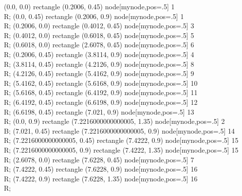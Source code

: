  (0.0, 0.0) rectangle (0.2006, 0.45) node[mynode,pos=.5] {1 \\ R};
 (0.0, 0.45) rectangle (0.2006, 0.9) node[mynode,pos=.5] {1 \\ R};
 (0.2006, 0.0) rectangle (0.4012, 0.45) node[mynode,pos=.5] {3 \\ R};
 (0.4012, 0.0) rectangle (0.6018, 0.45) node[mynode,pos=.5] {5 \\ R};
 (0.6018, 0.0) rectangle (2.6078, 0.45) node[mynode,pos=.5] {6 \\ R};
 (0.2006, 0.45) rectangle (3.8114, 0.9) node[mynode,pos=.5] {4 \\ R};
 (3.8114, 0.45) rectangle (4.2126, 0.9) node[mynode,pos=.5] {8 \\ R};
 (4.2126, 0.45) rectangle (5.4162, 0.9) node[mynode,pos=.5] {9 \\ R};
 (5.4162, 0.45) rectangle (5.6168, 0.9) node[mynode,pos=.5] {10 \\ R};
 (5.6168, 0.45) rectangle (6.4192, 0.9) node[mynode,pos=.5] {11 \\ R};
 (6.4192, 0.45) rectangle (6.6198, 0.9) node[mynode,pos=.5] {12 \\ R};
 (6.6198, 0.45) rectangle (7.021, 0.9) node[mynode,pos=.5] {13 \\ R};
 (0.0, 0.9) rectangle (7.2216000000000005, 1.35) node[mynode,pos=.5] {2 \\ B};
 (7.021, 0.45) rectangle (7.2216000000000005, 0.9) node[mynode,pos=.5] {14 \\ R};
 (7.2216000000000005, 0.45) rectangle (7.4222, 0.9) node[mynode,pos=.5] {15 \\ R};
 (7.2216000000000005, 0.9) rectangle (7.4222, 1.35) node[mynode,pos=.5] {15 \\ R};
 (2.6078, 0.0) rectangle (7.6228, 0.45) node[mynode,pos=.5] {7 \\ R};
 (7.4222, 0.45) rectangle (7.6228, 0.9) node[mynode,pos=.5] {16 \\ R};
 (7.4222, 0.9) rectangle (7.6228, 1.35) node[mynode,pos=.5] {16 \\ R};
